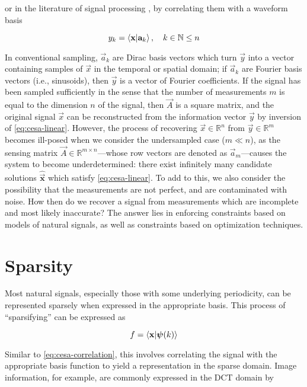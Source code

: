 \noindent or in the literature of signal processing \cite{Candes2008b}, by correlating them with a waveform basis

\begin{equation}\label{eq:cesa-correlation}
	y_k = \innerproduct{\vec{x}}{\vec{a}_k} , \quad k \in \mathbb{N} \leq n
\end{equation}

\noindent In conventional sampling, $\vec{a}_k$ are Dirac basis vectors which turn $\vec{y}$ into a vector containing samples of $\vec{x}$ in the temporal or spatial domain; if $\vec{a}_k$ are Fourier basis vectors (i.e., sinusoids), then $\vec{y}$ is a vector of Fourier coefficients. If the signal has been sampled sufficiently in the sense that the number of measurements $m$ is equal to the dimension $n$ of the signal, then $\vec{A}$ is a square matrix, and the original signal $\vec{x}$ can be reconstructed from the information vector $\vec{y}$ by inversion of \eqref{eq:cesa-linear}. However, the process of recovering $\vec{x} \in \mathbb{R}^n$ from $\vec{y} \in \mathbb{R}^m$ becomes ill-posed when we consider the undersampled case ($m \ll n$), as the sensing matrix $\vec{A} \in \mathbb{R}^{m \times n}$---whose row vectors are denoted as $\vec{a}_m$---causes the system to become underdetermined: there exist infinitely many candidate solutions $\bm\hat{\vec{x}}$ which satisfy \eqref{eq:cesa-linear}. To add to this, we also consider the possibility that the measurements are not perfect, and are contaminated with noise. How then do we recover a signal from measurements which are incomplete and most likely inaccurate? The answer lies in enforcing constraints based on models of natural signals, as well as constraints based on optimization techniques.

\section{Sparsity}
\label{sec:sparsity}

Most natural signals, especially those with some underlying periodicity, can be represented sparsely when expressed in the appropriate basis. This process of ``sparsifying'' can be expressed as

\begin{equation}\label{eq:sparsify}
	f = \innerproduct{\vec{x}}{\bm\psi(k)}
\end{equation}

\noindent Similar to \eqref{eq:cesa-correlation}, this involves correlating the signal with the appropriate basis function to yield a representation in the sparse domain. Image information, for example, are commonly expressed in the DCT domain by

